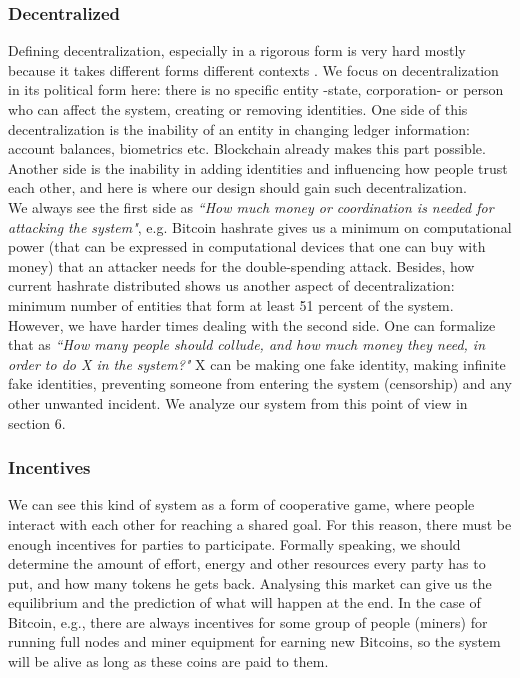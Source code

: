 \documentclass[conference]{IEEEtran}
\begin{document}
\subsubsection{Decentralized}
Defining decentralization, especially in a rigorous form is very hard mostly because it takes different forms different contexts \cite{meaning-of-decentralization}. We focus on decentralization in its political form here: there is no specific entity -state, corporation- or person who can affect the system, creating or removing identities. One side of this decentralization is the inability of an entity in changing ledger information: account balances, biometrics etc. Blockchain already makes this part possible. Another side is the inability in adding identities and influencing how people trust each other, and here is where our design should gain such decentralization.
\\
We always see the first side as \textit{``How much money or coordination is needed for attacking the system"}, e.g. Bitcoin hashrate gives us a minimum on computational power (that can be expressed in computational devices that one can buy with money) that an attacker needs for the double-spending attack. Besides, how current hashrate distributed shows us another aspect of decentralization: minimum number of entities that form at least 51 percent of the system. However, we have harder times dealing with the second side. One can formalize that as \textit{``How many people should collude, and how much money they need, in order to do X in the system?"} X can be making one fake identity, making infinite fake identities, preventing someone from entering the system (censorship) and any other unwanted incident. We analyze our system from this point of view in section 6. 


\subsubsection{Incentives}
We can see this kind of system as a form of cooperative game, where people interact with each other for reaching a shared goal. For this reason, there must be enough incentives for parties to participate. Formally speaking, we should determine the amount of effort, energy and other resources every party has to put, and how many tokens he gets back. Analysing this market can give us the equilibrium and the prediction of what will happen at the end. In the case of Bitcoin, e.g., there are always incentives for some group of people (miners) for running full nodes and miner equipment for earning new Bitcoins, so the system will be alive as long as these coins are paid to them.
\end{document}
